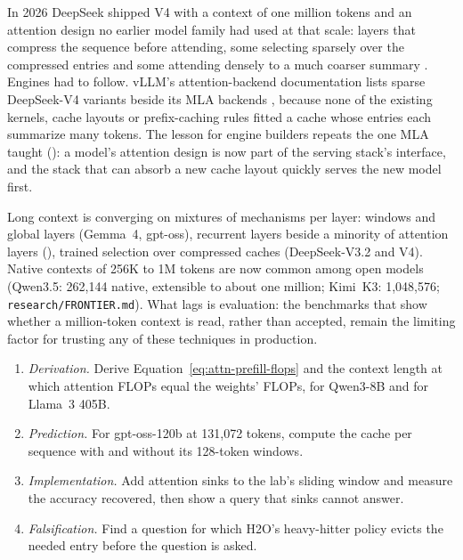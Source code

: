 


In 2026 DeepSeek shipped V4 with a context of one million tokens and an
attention design no earlier model family had used at that scale: layers that
compress the sequence before attending, some selecting sparsely over the
compressed entries and some attending densely to a much coarser summary
\cite{deepseek2026v4}. Engines had to follow. vLLM's attention-backend
documentation lists sparse DeepSeek-V4 variants beside its MLA backends
\cite{vllm2026attentionbackends}, because none of the existing kernels, cache
layouts or prefix-caching rules fitted a cache whose entries each summarize
many tokens. The lesson for engine builders repeats the one MLA taught
(): a model's attention design is now part of the serving
stack's interface, and the stack that can absorb a new cache layout quickly
serves the new model first.


Long context is converging on mixtures of mechanisms per layer: windows and
global layers (Gemma~4, gpt-oss), recurrent layers beside a minority of
attention layers (), trained selection over compressed
caches (DeepSeek-V3.2 and V4). Native contexts of 256K to 1M tokens are now
common among open models (Qwen3.5: 262,144 native, extensible to about one
million; Kimi~K3: 1,048,576; \texttt{research/FRONTIER.md}). What lags is
evaluation: the benchmarks that show whether a million-token context is read,
rather than accepted, remain the limiting factor for trusting any of these
techniques in production.

\ExercisesSection

\begin{enumerate}
\item \emph{Derivation.} Derive Equation~\ref{eq:attn-prefill-flops} and the
  context length at which attention FLOPs equal the weights' FLOPs, for Qwen3-8B
  and for Llama~3 405B.
\item \emph{Prediction.} For gpt-oss-120b at 131,072 tokens, compute the cache
  per sequence with and without its 128-token windows.
\item \emph{Implementation.} Add attention sinks to the lab's sliding window
  and measure the accuracy recovered, then show a query that sinks cannot
  answer.
\item \emph{Falsification.} Find a question for which H2O's heavy-hitter
  policy evicts the needed entry before the question is asked.
\end{enumerate}
